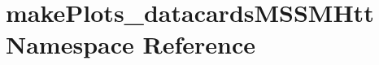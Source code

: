 \hypertarget{namespacemakePlots__datacardsMSSMHtt}{
\section{makePlots\_\-datacardsMSSMHtt Namespace Reference}
\label{namespacemakePlots__datacardsMSSMHtt}
}

